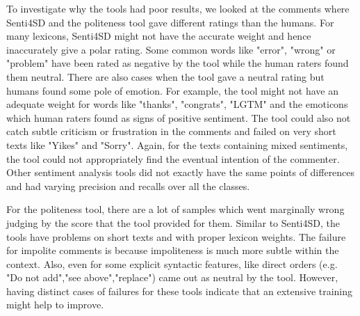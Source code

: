 To investigate why the tools had poor results, 
we looked at the comments where
Senti4SD and the politeness tool
gave different ratings than the humans.
For many lexicons, 
Senti4SD might not have the accurate weight 
and hence inaccurately give a polar rating. 
Some common words like "error", "wrong" or "problem" 
have been rated as negative by the tool 
while the human raters found them neutral. 
There are also cases when the tool gave a neutral rating 
but humans found some pole of emotion. 
For example, the tool might not have an adequate weight 
for words like "thanks", "congrats", "LGTM" 
and the emoticons which human raters found 
as signs of positive sentiment. 
The tool could also not catch 
subtle criticism or frustration in the comments and 
failed on very short texts like 
"Yikes" and "Sorry". 
Again, for the texts containing mixed sentiments, 
the tool could not appropriately find 
the eventual intention of the commenter. 
Other sentiment analysis tools did not 
exactly have the same points of differences 
and had varying precision and recalls over all the classes. 

For the politeness tool, 
there are a lot of samples 
which went marginally wrong 
judging by the score that the tool provided for them.
Similar to Senti4SD, the tools have problems
on short texts and
with proper lexicon weights. 
The failure for impolite comments is because 
impoliteness is much more subtle within the context. 
Also, even for some explicit syntactic features, 
like direct orders (e.g. "Do not add","see above","replace") 
came out as neutral by the tool. 
However, having distinct cases of failures for these tools 
indicate that an extensive training might help to improve.

